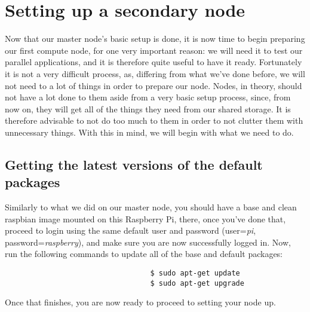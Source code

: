 \documentclass[]{article}
\begin{document}
                                  \section{Setting up a secondary node}
                                  Now that our master node's basic setup is done, it is now time to begin preparing our first compute node, for one very  important 
                                  reason: we will need it to test our parallel applications, and it is therefore quite useful to have it ready. Fortunately it is
                                  not a very difficult process, as, differing from what we've done before, we will not need to a lot of things in order to prepare
                                  our node. Nodes, in theory, should not have a lot done to them aside from a very basic setup process, since, from now on, they will
                                  get all of the things they need from our shared storage. It is therefore advisable to not do too much to them in order to not clutter
                                  them with unnecessary things. With this in mind, we will begin with what we need to do.

                                  \subsection{Getting the latest versions of the default packages}
                                  Similarly to what we did on our master node, you should have a base and clean raspbian image mounted on this Raspberry Pi, there, once 
                                  you've done that, proceed to login using the same default user and password (user=\textit{pi}, password=\textit{raspberry}), and make 
                                  sure you are now successfully logged in. Now, run the following commands to update all of the base and default packages:
                                  \begin{lstlisting}
                                  $ sudo apt-get update
                                  $ sudo apt-get upgrade
                                  \end{lstlisting}
                                  Once that finishes, you are now ready to proceed to setting your node up.
\end{document}
